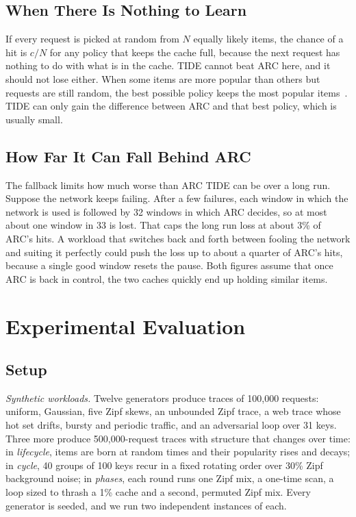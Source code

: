 \documentclass{llncs}
\begin{document}
\subsection{When There Is Nothing to Learn}

If every request is picked at random from $N$ equally likely items, the chance of a hit is $c/N$ for any policy that keeps the cache full, because the next request has nothing to do with what is in the cache. TIDE cannot beat ARC here, and it should not lose either. When some items are more popular than others but requests are still random, the best possible policy keeps the most popular items~\cite{aho1971}. TIDE can only gain the difference between ARC and that best policy, which is usually small.

\subsection{How Far It Can Fall Behind ARC}

The fallback limits how much worse than ARC TIDE can be over a long run. Suppose the network keeps failing. After a few failures, each window in which the network is used is followed by 32 windows in which ARC decides, so at most about one window in 33 is lost. That caps the long run loss at about 3\% of ARC's hits. A workload that switches back and forth between fooling the network and suiting it perfectly could push the loss up to about a quarter of ARC's hits, because a single good window resets the pause. Both figures assume that once ARC is back in control, the two caches quickly end up holding similar items.

\section{Experimental Evaluation}
\label{sec:eval}

\subsection{Setup}

\emph{Synthetic workloads.} Twelve generators produce traces of 100,000 requests: uniform, Gaussian, five Zipf skews, an unbounded Zipf trace, a web trace whose hot set drifts, bursty and periodic traffic, and an adversarial loop over 31 keys. Three more produce 500,000-request traces with structure that changes over time: in \emph{lifecycle}, items are born at random times and their popularity rises and decays; in \emph{cycle}, 40 groups of 100 keys recur in a fixed rotating order over 30\% Zipf background noise; in \emph{phases}, each round runs one Zipf mix, a one-time scan, a loop sized to thrash a 1\% cache and a second, permuted Zipf mix. Every generator is seeded, and we run two independent instances of each.
\end{document}

